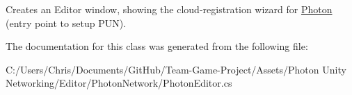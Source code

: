 Creates an Editor window, showing the cloud-\/registration wizard for \hyperlink{namespace_photon}{Photon} (entry point to setup P\+UN).



The documentation for this class was generated from the following file\+:\begin{DoxyCompactItemize}
\item 
C\+:/\+Users/\+Chris/\+Documents/\+Git\+Hub/\+Team-\/\+Game-\/\+Project/\+Assets/\+Photon Unity Networking/\+Editor/\+Photon\+Network/Photon\+Editor.\+cs\end{DoxyCompactItemize}
